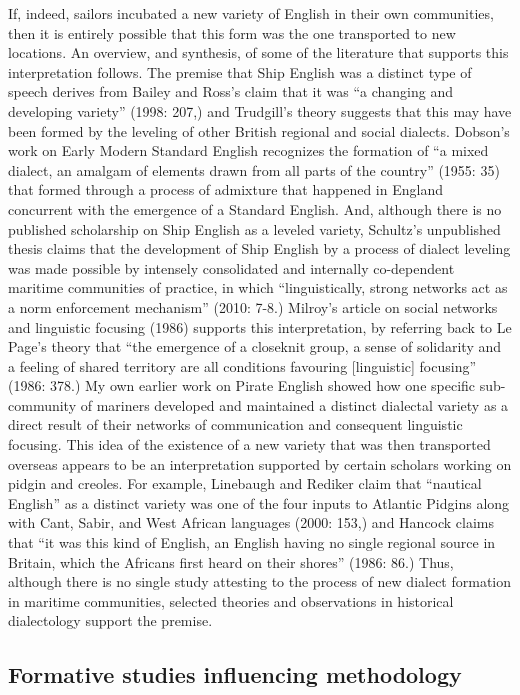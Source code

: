 If, indeed, sailors incubated a new variety of English in their own communities, then it is entirely possible that this form was the one transported to new locations. An overview, and synthesis, of some of the literature that supports this interpretation follows. The premise that Ship English was a distinct type of speech derives from Bailey and Ross’s claim that it was “a changing and developing variety” (1998: 207,) and Trudgill’s theory suggests that this may have been formed by the leveling of other British regional and social dialects. Dobson’s work on Early Modern Standard English recognizes the formation of “a mixed dialect, an amalgam of elements drawn from all parts of the country” (1955: 35) that formed through a process of admixture that happened in England concurrent with the emergence of a Standard English. And, although there is no published scholarship on Ship English as a leveled variety, Schultz’s unpublished thesis claims that the development of Ship English by a process of dialect leveling was made possible by intensely consolidated and internally co-dependent maritime communities of practice, in which “linguistically, strong networks act as a norm enforcement mechanism” (2010: 7-8.) Milroy’s article on social networks and linguistic focusing (1986) supports this interpretation, by referring back to Le Page’s theory that “the emergence of a closeknit group, a sense of solidarity and a feeling of shared territory are all conditions favouring [linguistic] focusing” (1986: 378.) My own earlier work on Pirate English \citep{Delgado2013} showed how one specific sub-community of mariners developed and maintained a distinct dialectal variety as a direct result of their networks of communication and consequent linguistic focusing. This idea of the existence of a new variety that was then transported overseas appears to be an interpretation supported by certain scholars working on pidgin and creoles.  For example, Linebaugh and Rediker claim that “nautical English” as a distinct variety was one of the four inputs to Atlantic Pidgins along with Cant, Sabir, and West African languages (2000: 153,) and Hancock claims that “it was this kind of English, an English having no single regional source in Britain, which the Africans first heard on their shores” (1986: 86.) Thus, although there is no single study attesting to the process of new dialect formation in maritime communities, selected theories and observations in historical dialectology support the premise. 

\subsection{\textbf{Formative} \textbf{studies} \textbf{influencing} \textbf{methodology}}%

